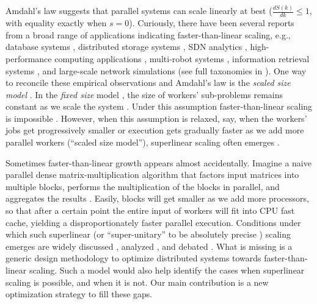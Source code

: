 Amdahl's law suggests that parallel systems can scale linearly at best ($\frac{d S(k)}{d k} \le 1$, with equality exactly when $s=0$).  Curiously, there have been several reports from a broad range of applications indicating faster-than-linear scaling, e.g., database systems \cite{scalability-analyzed, 10.5555/1012889.1012894}, distributed storage systems \cite{271208, dobb-2, icsoft20}, SDN analytics \cite{sdn-analytitcs}, high-performance computing applications \cite{556383, 7733347, 6483679}, multi-robot systems \cite{10.1007/978-3-319-77610-1}, information retrieval systems \cite{dobb-1, dobb-2}, and large-scale network simulations \cite{10.1145/3627703.3629574} (see full taxonomies in \cite{7733347, 80148}). %
One way to reconcile these empirical observations and Amdahl's law is the \emph{scaled size model} \cite{556383}. In the \emph{fixed size} model \cite{556383}, the size of workers' sub-problems remains constant as we scale the system \cite{10.1145/42411.42415}. Under this assumption faster-than-linear scaling is impossible \cite{10.1016/0167-8191(86)90024-4}. However, when this assumption is relaxed, say, when the workers' jobs get progressively smaller or execution gets gradually faster as we add more parallel workers (``scaled size model''), superlinear scaling often emerges \cite{scalability-analyzed, sdn-analytitcs, 6483679, 10.1007/978-3-319-77610-1}.

Sometimes faster-than-linear growth appears almost accidentally. Imagine a naive parallel dense matrix-multiplication algorithm that factors input matrices into multiple blocks, performs the multiplication of the blocks in parallel, and aggregates the results \cite{7733347}. Easily, blocks will get smaller as we add more processors, so that after a certain point the entire input of workers will fit into CPU fast cache, yielding a disproportionately faster parallel execution. Conditions under which such superlinear (or ``super-unitary'' to be absolutely precise \cite{80148}) scaling emerges are widely discussed \cite{556383, dobb-1, dobb-2}, analyzed \cite{80148, 7733347}, and debated \cite{gunther-hotsos, 10.1016/0167-8191(86)90024-4, 10.1145/2773212.2789974}. What is missing is a generic design methodology to optimize distributed systems towards faster-than-linear scaling. Such a model would also help identify the cases when superlinear scaling is possible, and when it is not.  Our main contribution is a new optimization strategy to fill these gaps.

